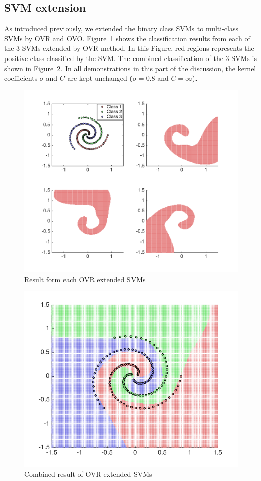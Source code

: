 \documentclass[10pt,twocolumn,letterpaper]{article}
\begin{document}
\subsection{SVM extension}
As introduced previously, we extended the binary class SVMs to multi-class SVMs by OVR and OVO. Figure~\ref{fig:q2_ovr_3} shows the classification results from each of the 3 SVMs extended by OVR method. In this Figure, red regions represents the positive class classified by the SVM. The combined classification of the 3 SVMs is shown in Figure~\ref{fig:q2_ovr}. In all demonstrations in this part of the discussion, the kernel coefficients $\sigma$ and $C$ are kept unchanged ($\sigma = 0.8$ and $C = \infty$).

\begin{figure}
	\begin{center}
		\includegraphics[width=0.8\linewidth]{q2_ovr_3}
		\caption{Result form each OVR extended SVMs}
		\label{fig:q2_ovr_3}
	\end{center}
\end{figure}

\begin{figure}
	\begin{center}
		\includegraphics[width=0.8\linewidth]{q2_ovr_sig08}
		\caption{Combined result of OVR extended SVMs}
		\label{fig:q2_ovr}
	\end{center}
\end{figure}
\end{document}
